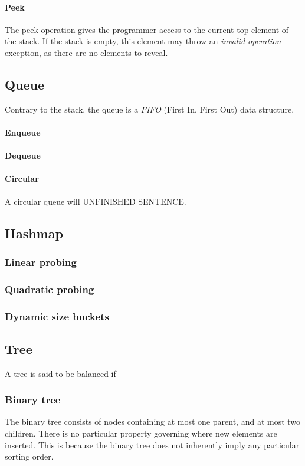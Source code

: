 \documentclass{article}
\begin{document}
\paragraph{Peek}
The peek operation gives the programmer access to the current top element of the stack.
If the stack is empty, this element may throw an {\em invalid operation} exception, as there are no elements to reveal.


\subsection{Queue}
Contrary to the stack, the queue is a {\em FIFO} (First In, First Out) data structure.


\paragraph{Enqueue}
\paragraph{Dequeue}
\paragraph{Circular}
A circular queue will {\huge UNFINISHED SENTENCE}.

\newpage

\subsection{Hashmap}
\subsubsection{Linear probing}
\subsubsection{Quadratic probing}
\subsubsection{Dynamic size buckets}

\newpage


\subsection{Tree}
A tree is said to be balanced if

\subsubsection{Binary tree}
The binary tree consists of nodes containing at most one parent, and at most two children.
There is no particular property governing where new elements are inserted.
This is because the binary tree does not inherently imply any particular sorting order.
\end{document}
